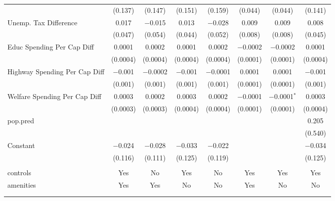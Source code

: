 \begin{table}[!htbp]
\begin{tabular}{@{\extracolsep{5pt}}lccccccc}
  & (0.137) & (0.147) & (0.151) & (0.159) & (0.044) & (0.044) & (0.141) \\ 
  Unemp. Tax Difference & 0.017 & $-$0.015 & 0.013 & $-$0.028 & 0.009 & 0.009 & 0.008 \\ 
  & (0.047) & (0.054) & (0.044) & (0.052) & (0.008) & (0.008) & (0.045) \\ 
  Educ Spending Per Cap Diff & 0.0001 & 0.0002 & 0.0001 & 0.0002 & $-$0.0002 & $-$0.0002 & 0.0001 \\ 
  & (0.0004) & (0.0004) & (0.0004) & (0.0004) & (0.0001) & (0.0001) & (0.0004) \\ 
  Highway Spending Per Cap Diff & $-$0.001 & $-$0.0002 & $-$0.001 & $-$0.0001 & 0.0001 & 0.0001 & $-$0.001 \\ 
  & (0.001) & (0.001) & (0.001) & (0.001) & (0.0001) & (0.0001) & (0.001) \\ 
  Welfare Spending Per Cap Diff & 0.0003 & 0.0002 & 0.0003 & 0.0002 & $-$0.0001 & $-$0.0001$^{*}$ & 0.0003 \\ 
  & (0.0003) & (0.0003) & (0.0004) & (0.0004) & (0.0001) & (0.0001) & (0.0004) \\ 
  pop.pred &  &  &  &  &  &  & 0.205 \\ 
  &  &  &  &  &  &  & (0.540) \\ 
  Constant & $-$0.024 & $-$0.028 & $-$0.033 & $-$0.022 &  &  & $-$0.034 \\ 
  & (0.116) & (0.111) & (0.125) & (0.119) &  &  & (0.125) \\ 
 \hline \\[-1.8ex] 
controls & Yes & No & Yes & No & Yes & Yes & Yes \\ 
amenities & Yes & Yes & No & No & Yes & No & No \\ 
\hline \\[-1.8ex] 
\hline 
\hline \\[-1.8ex] 
\end{tabular} 
\end{table} 
